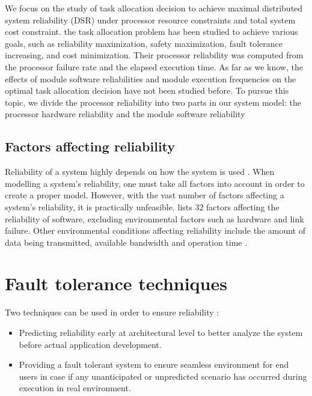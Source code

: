 \documentclass{cslthse-msc}
\begin{document}
We focus on the study of task allocation decision to achieve maximal distributed system reliability (DSR) under processor resource constraints and total system cost constraint. the task allocation problem has been studied to achieve various goals, such as reliability maximization, safety maximization, fault tolerance increasing, and cost minimization. Their processor reliability was computed from the processor failure rate and the elapsed execution time. As far as we know, the effects of module software reliabilities and module execution frequencies on the optimal task allocation decision have not been studied before. To pursue this topic, we divide the processor reliability into two parts in our system model: the processor hardware reliability and the module software reliability \cite{decisionModelTaskAllocation}
\fi

\subsection{Factors affecting reliability}
Reliability of a system highly depends on how the system is used \cite{surveyRelPrediction}. When modelling a system's reliability, one must take all factors into account in order to create a proper model. However, with the vast number of factors affecting a system's reliability, it is practically unfeasible. \cite{factorsAffectingRel} lists 32 factors affecting the reliability of software, excluding environmental factors such as hardware and link failure. Other environmental conditions affecting reliability include the amount of data being transmitted, available bandwidth and operation time \cite{cloudServiceRel} \cite{hierarchicalRelModeling}.

\section{Fault tolerance techniques}
Two techniques can be used in order to ensure reliability \cite{surveyReliabilityDistr}:
\begin{itemize}
	\item Predicting reliability early at architectural level to better analyze the system before actual application development.
	\item Providing a fault tolerant system to ensure seamless environment for end users in case if any unanticipated or unpredicted scenario has occurred during execution in real environment.
\end{itemize}
\end{document}
